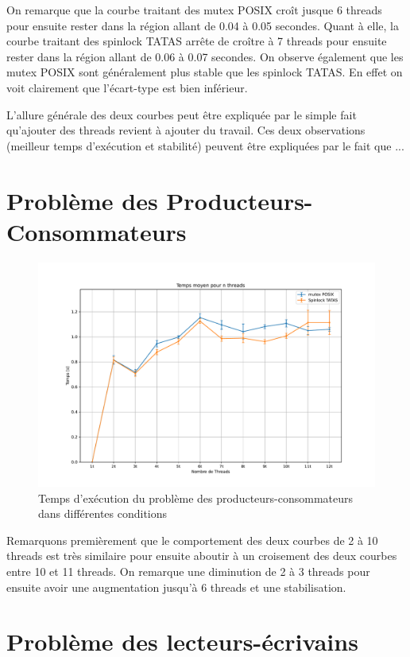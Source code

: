 On remarque que la courbe traitant des mutex POSIX croît jusque 6 threads pour ensuite rester dans la région allant de 0.04 à 0.05 secondes.
Quant à elle, la courbe traitant des spinlock TATAS arrête de croître à 7 threads pour ensuite rester dans la région allant de 0.06 à 0.07 secondes.
On observe également que les mutex POSIX sont généralement plus stable que les spinlock TATAS. En effet on voit clairement que l'écart-type est bien inférieur.

L'allure générale des deux courbes peut être expliquée par le simple fait qu'ajouter des threads revient à ajouter du travail.
Ces deux observations (meilleur temps d'exécution et stabilité) peuvent être expliquées par le fait que ...


\section{Problème des Producteurs-Consommateurs}

\begin{figure}[h!]
    \centering
    \includegraphics[scale=0.5]{img/prodcons.pdf}
    \caption{Temps d'exécution du problème des producteurs-consommateurs dans différentes conditions}
    \label{pic:prodcons}
\end{figure}

Remarquons premièrement que le comportement des deux courbes de 2 à 10 threads est très similaire pour ensuite aboutir à un croisement des deux courbes entre 10 et 11 threads.
On remarque une diminution de 2 à 3 threads pour ensuite avoir une augmentation jusqu'à 6 threads et une stabilisation.


\section{Problème des lecteurs-écrivains}



